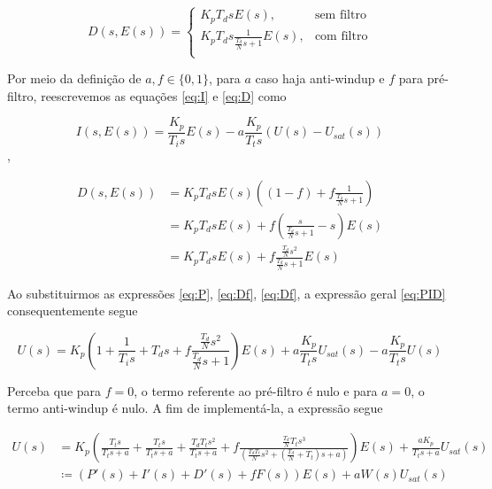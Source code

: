 \documentclass[twoside, fleqn]{article}
\begin{document}
        \begin{equation}
            D(s, E(s)) = 
            \begin{cases}
                K_p T_d s E(s), & \mbox{sem filtro} \\
                K_p T_d s \frac{1}{\frac{T_d}{N}s + 1} E(s), & \mbox{com filtro} \\
            \end{cases}
            \label{eq:D}
        \end{equation}
    
    Por meio da definição de $a, f \in \{0, 1\}$, para $a$ caso haja anti-windup e $f$ para pré-filtro, reescrevemos as equações \eqref{eq:I} e \eqref{eq:D} como
    
        \begin{equation}
            I(s, E(s)) =  \frac{K_p}{T_i s} E(s) - a \frac{K_p}{T_t s} \left( U(s) - U_{sat}(s)\right)
            \label{eq:Ia}
        \end{equation},
    
        \begin{equation}
            \begin{split}
                D(s, E(s)) &= K_p T_d s E(s) \left((1-f) + f \frac{1}{\frac{T_d}{N}s + 1}\right) \\
                & = K_p T_d s E(s) + f \left(\frac{s}{\frac{T_d}{N} s + 1}  - s\right) E(s) \\
                & = K_p T_d s E(s) + f \frac{\frac{T_d}{N} s^2}{\frac{T_d}{N}s + 1} E(s)
            \end{split}
            \label{eq:Df}
        \end{equation}
    
    Ao substituirmos as expressões \eqref{eq:P}, \eqref{eq:Df}, \eqref{eq:Df}, a expressão geral \eqref{eq:PID} consequentemente segue 
    
        \begin{equation}
            U(s) = K_p \left(1 + \frac{1}{T_i s} + T_d s + f \frac{\frac{T_d}{N} s^2}{\frac{T_d}{N}s+1}\right) E(s) +  a \frac{K_p}{T_t s} U_{sat}(s) - a \frac{K_p}{T_t s} U(s)
            \label{eq:PIDaf}
        \end{equation}
    
    Perceba que para $f=0$, o termo referente ao pré-filtro é nulo e para $a = 0$, o termo anti-windup é nulo. A fim de implementá-la, a expressão segue
    
        \begin{equation}
            \begin{split}
                U(s) &= K_p \left(\frac{T_t s}{T_t s + a} + \frac{T_t s}{T_t s + a} + \frac{T_d T_t s^2}{T_t s + a} + f \frac{\frac{T_d}{N} T_t s^3}{\left(\frac{T_d T_t}{N} s^2 + \left(\frac{T_d}{N} + T_t\right) s + a\right)} \right) E(s) + \frac{a K_p}{T_t s + a} U_{sat}(s) \\
                & \coloneqq \left(P'(s) + I'(s) + D'(s) + f F(s)\right) E(s) + a W(s) U_{sat}(s)
            \end{split}
            \label{eq:PIDfull}
        \end{equation}
    
\end{document}
